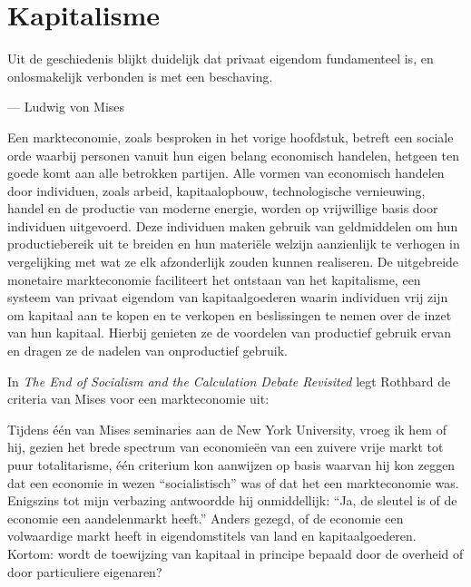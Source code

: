 \hypertarget{kapitalisme}{%
\chapter{Kapitalisme}\label{kapitalisme}}

\vspace{1em}
\begin{blockquotebox}
    Uit de geschiedenis blijkt duidelijk dat privaat eigendom fundamenteel is, en onlosmakelijk verbonden is met een beschaving.\footnotemark
    \par\raggedleft--- Ludwig von Mises    
\end{blockquotebox}

\vspace{2em}

Een markteconomie, zoals besproken in het vorige hoofdstuk, betreft een sociale orde waarbij personen vanuit hun eigen belang economisch handelen, hetgeen ten goede komt aan alle betrokken partijen. Alle vormen van economisch handelen door individuen, zoals arbeid, kapitaalopbouw, technologische vernieuwing, handel en de productie van moderne energie, worden op vrijwillige basis door individuen uitgevoerd. Deze individuen maken gebruik van geldmiddelen om hun productiebereik uit te breiden en hun materiële welzijn aanzienlijk te verhogen in vergelijking met wat ze elk afzonderlijk zouden kunnen realiseren. De uitgebreide monetaire markteconomie faciliteert het ontstaan van het kapitalisme, een systeem van privaat eigendom van kapitaalgoederen waarin individuen vrij zijn om kapitaal aan te kopen en te verkopen en beslissingen te nemen over de inzet van hun kapitaal. Hierbij genieten ze de voordelen van productief gebruik ervan en dragen ze de nadelen van onproductief gebruik.



In \emph{The End of Socialism and the Calculation Debate Revisited} legt Rothbard de criteria van Mises voor een markteconomie uit:

\begin{blockquotebox}
    Tijdens één van Mises\textquotesingle{} seminaries aan de New York University, vroeg ik hem of hij, gezien het brede spectrum van economieën van een zuivere vrije markt tot puur totalitarisme, één criterium kon aanwijzen op basis waarvan hij kon zeggen dat een economie in wezen ``socialistisch'' was of dat het een markteconomie was. Enigszins tot mijn verbazing antwoordde hij onmiddellijk: ``Ja, de sleutel is of de economie een aandelenmarkt heeft.'' Anders gezegd, of de economie een volwaardige markt heeft in eigendomstitels van land en kapitaalgoederen. Kortom: wordt de toewijzing van kapitaal in principe bepaald door de overheid of door particuliere eigenaren?\footnotemark
\end{blockquotebox}

